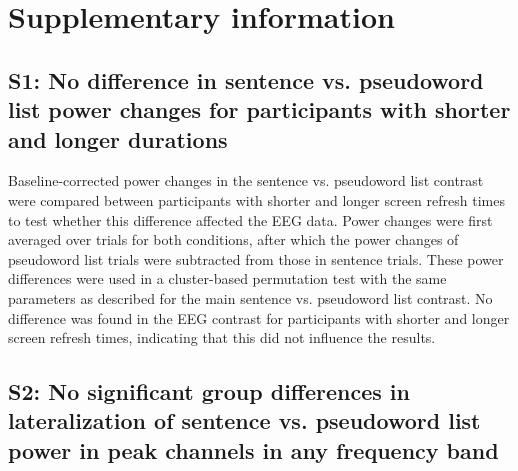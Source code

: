\newpage

\section{Supplementary information}

\subsection{S1: No difference in sentence vs. pseudoword list power changes for participants with shorter and longer durations} \label{suppl-note}
Baseline-corrected power changes in the sentence vs. pseudoword list contrast were compared between participants with shorter and longer screen refresh times to test whether this difference affected the EEG data. Power changes were first averaged over trials for both conditions, after which the power changes of pseudoword list trials were subtracted from those in sentence trials. These power differences were used in a cluster-based permutation test with the same parameters as described for the main sentence vs. pseudoword list contrast. No difference was found in the EEG contrast for participants with shorter and longer screen refresh times, indicating that this did not influence the results.

\subsection{S2: No significant group differences in lateralization of sentence vs. pseudoword list power in peak channels in any frequency band}

\vspace{-1cm}

 

\clearpage
